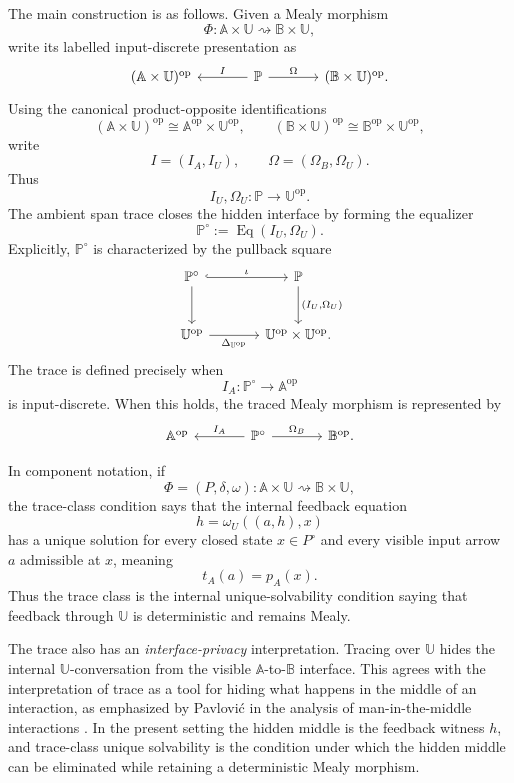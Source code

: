 The main construction is as follows.  Given a Mealy morphism
\[
\Phi:\mathbb A\times\mathbb U
\rightsquigarrow
\mathbb B\times\mathbb U,
\]
write its labelled input-discrete presentation as
\[
\begin{tikzcd}[column sep=large]
(\mathbb A\times\mathbb U)^{\mathrm{op}}
&
\mathbb P
  \arrow[l, "I"']
  \arrow[r, "\Omega"]
&
(\mathbb B\times\mathbb U)^{\mathrm{op}} .
\end{tikzcd}
\]
Using the canonical product-opposite identifications
\[
(\mathbb A\times\mathbb U)^{\mathrm{op}}
\cong
\mathbb A^{\mathrm{op}}\times\mathbb U^{\mathrm{op}},
\qquad
(\mathbb B\times\mathbb U)^{\mathrm{op}}
\cong
\mathbb B^{\mathrm{op}}\times\mathbb U^{\mathrm{op}},
\]
write
\[
I=(I_A,I_U),
\qquad
\Omega=(\Omega_B,\Omega_U).
\]
Thus
\[
I_U,\Omega_U:\mathbb P\longrightarrow\mathbb U^{\mathrm{op}}.
\]
The ambient span trace closes the hidden interface by forming the equalizer
\[
\mathbb P^\circ
:=
\operatorname{Eq}(I_U,\Omega_U).
\]
Explicitly, \(\mathbb P^\circ\) is characterized by the pullback square
\[
\begin{tikzcd}[column sep=large,row sep=large]
\mathbb P^\circ
  \arrow[r, hook, "\iota"]
  \arrow[d]
&
\mathbb P
  \arrow[d, "{(I_U,\Omega_U)}"]
\\
\mathbb U^{\mathrm{op}}
  \arrow[r, "\Delta_{\mathbb U^{\mathrm{op}}}"']
&
\mathbb U^{\mathrm{op}}\times\mathbb U^{\mathrm{op}} .
\end{tikzcd}
\]
The trace is defined precisely when
\[
I_A:\mathbb P^\circ\to\mathbb A^{\mathrm{op}}
\]
is input-discrete.  When this holds, the traced Mealy morphism is represented
by
\[
\begin{tikzcd}[column sep=large]
\mathbb A^{\mathrm{op}}
&
\mathbb P^\circ
  \arrow[l, "I_A"']
  \arrow[r, "\Omega_B"]
&
\mathbb B^{\mathrm{op}} .
\end{tikzcd}
\]

In component notation, if
\[
\Phi=(P,\delta,\omega):
\mathbb A\times\mathbb U
\rightsquigarrow
\mathbb B\times\mathbb U,
\]
the trace-class condition says that the internal feedback equation
\[
h=\omega_U((a,h),x)
\]
has a unique solution for every closed state \(x\in P^\circ\) and every
visible input arrow \(a\) admissible at \(x\), meaning
\[
t_A(a)=p_A(x).
\]
Thus the trace class is the internal unique-solvability condition saying that
feedback through \(\mathbb U\) is deterministic and remains Mealy.

The trace also has an \emph{interface-privacy} interpretation.  Tracing over
\(\mathbb U\) hides the internal \(\mathbb U\)-conversation from the visible
\(\mathbb A\)-to-\(\mathbb B\) interface.  This agrees with the interpretation
of trace as a tool for hiding what happens in the middle of an interaction,
as emphasized by Pavlovi\'c in the analysis of man-in-the-middle interactions
\cite{PavlovicTracingManInTheMiddle}.  In the present setting the hidden
middle is the feedback witness \(h\), and trace-class unique solvability is
the condition under which the hidden middle can be eliminated while retaining
a deterministic Mealy morphism.

